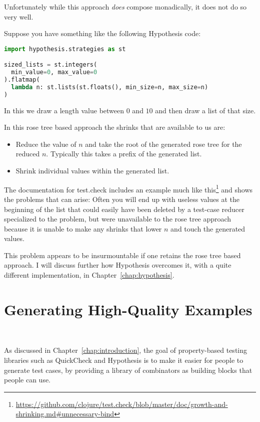 Unfortunately while this approach \emph{does} compose monadically,
it does not do so very well.

Suppose you have something like the following Hypothesis code:

\begin{lstlisting}[language=Python]
import hypothesis.strategies as st

sized_lists = st.integers(
  min_value=0, max_value=0
).flatmap(
  lambda n: st.lists(st.floats(), min_size=n, max_size=n)
)
\end{lstlisting}

In this we draw a length value between \(0\) and \(10\) and then draw a list of that size.

In this rose tree based approach the shrinks that are available to us are:

\begin{itemize}
\item Reduce the value of \(n\) and take the root of the generated rose tree for the reduced \(n\).
Typically this takes a prefix of the generated list.
\item Shrink individual values within the generated list.
\end{itemize}

The documentation for test.check includes an example much like this\footnote{\url{https://github.com/clojure/test.check/blob/master/doc/growth-and-shrinking.md\#unnecessary-bind}} and shows the problems that can arise:
Often you will end up with useless values at the beginning of the list that could easily have been deleted by a test-case reducer specialized to the problem,
but were unavailable to the rose tree approach because it is unable to make any shrinks that lower \(n\) and touch the generated values.

This problem appears to be insurmountable if one retains the rose tree based approach.
I will discuss further how Hypothesis overcomes it,
with a quite different implementation,
in Chapter~\ref{chap:hypothesis}.

\section{Generating High-Quality Examples}~\label{sec:goodexamples}

As discussed in Chapter~\ref{chap:introduction},
the goal of property-based testing libraries such as QuickCheck and Hypothesis is to make it easier for people to generate test cases,
by providing a library of combinators as building blocks that people can use.

